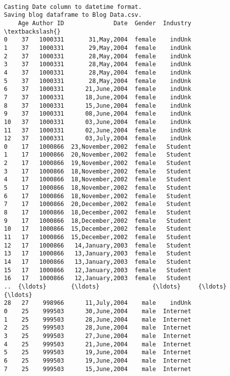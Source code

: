 \documentclass[11pt]{article}
\begin{document}
    
    \begin{Verbatim}[commandchars=\\\{\}]

Casting Date column to datetime format.
Saving blog dataframe to Blog Data.csv.
    Age Author ID              Date  Gender  Industry  \textbackslash{}
0    37   1000331       31,May,2004  female    indUnk   
1    37   1000331       29,May,2004  female    indUnk   
2    37   1000331       28,May,2004  female    indUnk   
3    37   1000331       28,May,2004  female    indUnk   
4    37   1000331       28,May,2004  female    indUnk   
5    37   1000331       28,May,2004  female    indUnk   
6    37   1000331      21,June,2004  female    indUnk   
7    37   1000331      18,June,2004  female    indUnk   
8    37   1000331      15,June,2004  female    indUnk   
9    37   1000331      08,June,2004  female    indUnk   
10   37   1000331      03,June,2004  female    indUnk   
11   37   1000331      02,June,2004  female    indUnk   
12   37   1000331      03,July,2004  female    indUnk   
0    17   1000866  23,November,2002  female   Student   
1    17   1000866  20,November,2002  female   Student   
2    17   1000866  19,November,2002  female   Student   
3    17   1000866  18,November,2002  female   Student   
4    17   1000866  18,November,2002  female   Student   
5    17   1000866  18,November,2002  female   Student   
6    17   1000866  18,November,2002  female   Student   
7    17   1000866  20,December,2002  female   Student   
8    17   1000866  18,December,2002  female   Student   
9    17   1000866  18,December,2002  female   Student   
10   17   1000866  15,December,2002  female   Student   
11   17   1000866  15,December,2002  female   Student   
12   17   1000866   14,January,2003  female   Student   
13   17   1000866   13,January,2003  female   Student   
14   17   1000866   13,January,2003  female   Student   
15   17   1000866   12,January,2003  female   Student   
16   17   1000866   12,January,2003  female   Student   
..  {\ldots}       {\ldots}               {\ldots}     {\ldots}       {\ldots}   
28   27    998966      11,July,2004    male    indUnk   
0    25    999503      30,June,2004    male  Internet   
1    25    999503      28,June,2004    male  Internet   
2    25    999503      28,June,2004    male  Internet   
3    25    999503      27,June,2004    male  Internet   
4    25    999503      21,June,2004    male  Internet   
5    25    999503      19,June,2004    male  Internet   
6    25    999503      19,June,2004    male  Internet   
7    25    999503      15,June,2004    male  Internet   

\end{Verbatim}
\end{document}
